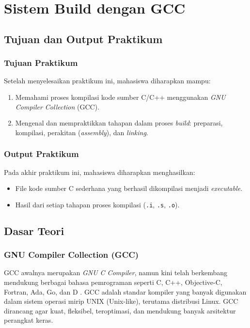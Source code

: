 
\chapter{Sistem Build dengan GCC}
\label{chap:modul-05}

\section{Tujuan dan Output Praktikum}

\subsection{Tujuan Praktikum}
Setelah menyelesaikan praktikum ini, mahasiswa diharapkan mampu:
\begin{enumerate}
	\item Memahami proses kompilasi kode sumber C/C++ menggunakan \textit{GNU Compiler Collection} (GCC).
	\item Mengenal dan mempraktikkan tahapan dalam proses \textit{build}: preparasi, kompilasi, perakitan (\textit{assembly}), dan \textit{linking}.
\end{enumerate}

\subsection{Output Praktikum}
Pada akhir praktikum ini, mahasiswa diharapkan menghasilkan:
\begin{itemize}
	\item File kode sumber C sederhana yang berhasil dikompilasi menjadi \textit{executable}.
	\item Hasil dari setiap tahapan proses kompilasi (\texttt{.i}, \texttt{.s}, \texttt{.o}).
\end{itemize}

\newpage
\section{Dasar Teori}

\subsection{GNU Compiler Collection (GCC)}
GCC awalnya merupakan \textit{GNU C Compiler}, namun kini telah berkembang mendukung berbagai bahasa pemrograman seperti C, C++, Objective-C, Fortran, Ada, Go, dan D \cite{gough2004introduction}. GCC adalah standar kompiler yang banyak digunakan dalam sistem operasi mirip UNIX (Unix-like), terutama distribusi Linux. GCC dirancang agar kuat, fleksibel, teroptimasi, dan mendukung banyak arsitektur perangkat keras.


